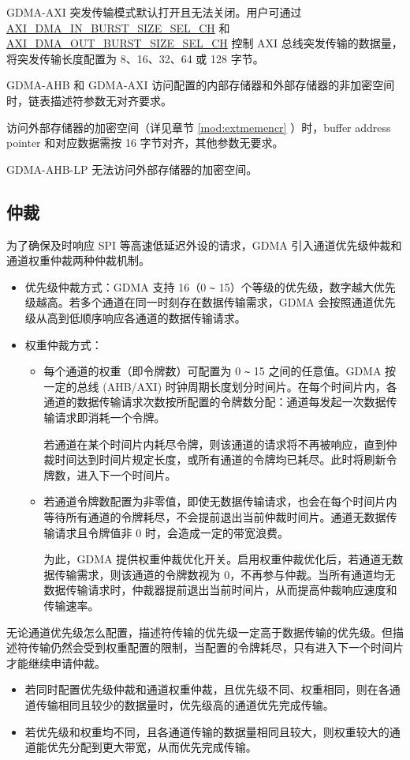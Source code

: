 \documentclass[main\_\_CN.tex]{subfiles}
\begin{document}
GDMA-AXI 突发传输模式默认打开且无法关闭。用户可通过 \hyperref[fielddesc:AXIDMAINBURSTSIZESELCHN]{AXI\_DMA\_IN\_BURST\_SIZE\_SEL\_CH} 和 \hyperref[fielddesc:AXIDMAOUTBURSTSIZESELCHN]{AXI\_DMA\_OUT\_BURST\_SIZE\_SEL\_CH} 控制 AXI 总线突发传输的数据量，将突发传输长度配置为 8、16、32、64 或 128 字节。

GDMA-AHB 和 GDMA-AXI 访问配置的内部存储器和外部存储器的非加密空间时，链表描述符参数无对齐要求。

访问外部存储器的加密空间（详见章节 \ref{mod:extmemencr} \textit{}）时，buffer address pointer 和对应数据需按 16 字节对齐，其他参数无要求。

GDMA-AHB-LP 无法访问外部存储器的加密空间。


\subsection{仲裁}

为了确保及时响应 SPI 等高速低延迟外设的请求，GDMA 引入通道优先级仲裁和通道权重仲裁两种仲裁机制。
\begin{itemize}
\item 优先级仲裁方式：GDMA 支持 16（0 \verb+~+ 15）个等级的优先级，数字越大优先级越高。若多个通道在同一时刻存在数据传输需求，GDMA 会按照通道优先级从高到低顺序响应各通道的数据传输请求。
\item 权重仲裁方式：
    \begin{itemize}
        \item 每个通道的权重（即令牌数）可配置为 0 \verb+~+ 15 之间的任意值。GDMA 按一定的总线 (AHB/AXI) 时钟周期长度划分时间片。在每个时间片内，各通道的数据传输请求次数按所配置的令牌数分配：通道每发起一次数据传输请求即消耗一个令牌。

        若通道在某个时间片内耗尽令牌，则该通道的请求将不再被响应，直到仲裁时间达到时间片规定长度，或所有通道的令牌均已耗尽。此时将刷新令牌数，进入下一个时间片。
        \item 若通道令牌数配置为非零值，即使无数据传输请求，也会在每个时间片内等待所有通道的令牌耗尽，不会提前退出当前仲裁时间片。通道无数据传输请求且令牌值非 0 时，会造成一定的带宽浪费。

        为此，GDMA 提供权重仲裁优化开关。启用权重仲裁优化后，若通道无数据传输需求，则该通道的令牌数视为 0，不再参与仲裁。当所有通道均无数据传输请求时，仲裁器提前退出当前时间片，从而提高仲裁响应速度和传输速率。
    \end{itemize}
\end{itemize}
无论通道优先级怎么配置，描述符传输的优先级一定高于数据传输的优先级。但描述符传输仍然会受到权重配置的限制，当配置的令牌耗尽，只有进入下一个时间片才能继续申请仲裁。
\begin{tiplisting}
\vspace{-2em}
\begin{itemize}
    \item 若同时配置优先级仲裁和通道权重仲裁，且优先级不同、权重相同，则在各通道传输相同且较少的数据量时，优先级高的通道优先完成传输。
    \item 若优先级和权重均不同，且各通道传输的数据量相同且较大，则权重较大的通道能优先分配到更大带宽，从而优先完成传输。
\end{itemize}
\end{tiplisting}
\end{document}
